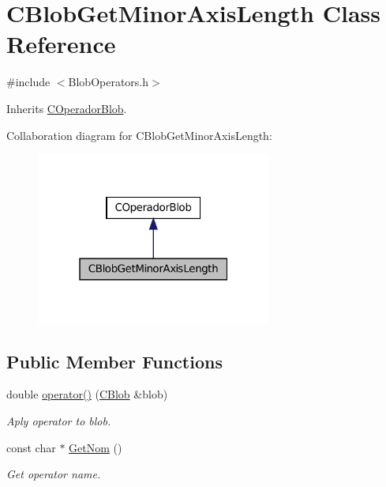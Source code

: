\hypertarget{class_c_blob_get_minor_axis_length}{
\section{CBlobGetMinorAxisLength Class Reference}
\label{class_c_blob_get_minor_axis_length}
}


{\ttfamily \#include $<$BlobOperators.h$>$}



Inherits \hyperlink{class_c_operador_blob}{COperadorBlob}.



Collaboration diagram for CBlobGetMinorAxisLength:
\nopagebreak
\begin{figure}[H]
\begin{center}
\leavevmode
\includegraphics[width=220pt]{class_c_blob_get_minor_axis_length__coll__graph}
\end{center}
\end{figure}
\subsection*{Public Member Functions}
\begin{DoxyCompactItemize}
\item 
double \hyperlink{class_c_blob_get_minor_axis_length_a2269bfa1651667f020e27d9f1e8f8d98}{operator()} (\hyperlink{class_c_blob}{CBlob} \&blob)
\begin{DoxyCompactList}\small\item\em Aply operator to blob. \item\end{DoxyCompactList}\item 
const char $\ast$ \hyperlink{class_c_blob_get_minor_axis_length_a2aad4f4a473864a2ce0409c7db35388d}{GetNom} ()
\begin{DoxyCompactList}\small\item\em Get operator name. \item\end{DoxyCompactList}\end{DoxyCompactItemize}


